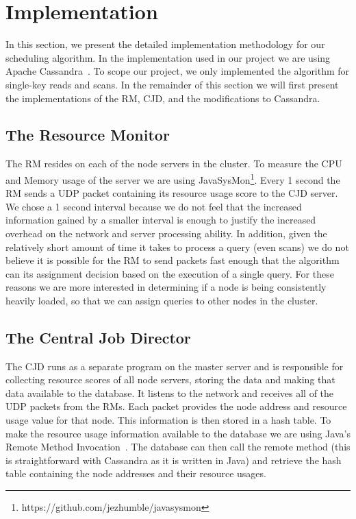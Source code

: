 \section{Implementation}
\label{sec:implementation}
In this section, we present the detailed implementation methodology for our scheduling algorithm. In the implementation used in our project we are using Apache Cassandra~\cite{ Lakshman:2010:CDS:1773912.1773922}. To scope our project, we only implemented the algorithm for single-key reads and scans. In the remainder of this section we will first present the implementations of the RM, CJD, and the modifications to Cassandra.

\subsection{The Resource Monitor}
The RM resides on each of the node servers in the cluster. To measure the CPU and Memory usage of the server we are using JavaSysMon\footnote{https://github.com/jezhumble/javasysmon}. Every 1 second the RM sends a UDP packet containing its resource usage score to the CJD server. We chose a 1 second interval because we do not feel that the increased information gained by a smaller interval is enough to justify the increased overhead on the network and server processing ability. In addition, given the relatively short amount of time it takes to process a query (even scans) we do not believe it is possible for the RM to send packets fast enough that the algorithm can its assignment decision based on the execution of a single query. For these reasons we are more interested in determining if a node is being consistently heavily loaded, so that we can assign queries to other nodes in the cluster.

\subsection{The Central Job Director}
The CJD runs as a separate program on the master server and is responsible for collecting resource scores of all node servers, storing the data and making that data available to the database. It listens to the network and receives all of the UDP packets from the RMs. Each packet provides the node address and resource usage value for that node. This information is then stored in a hash table. To make the resource usage information available to the database we are using Java’s Remote Method Invocation~\cite{JavaRMI}. The database can then call the remote method (this is straightforward with Cassandra as it is written in Java) and retrieve the hash table containing the node addresses and their resource usages.

